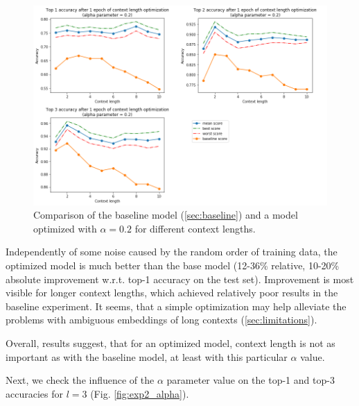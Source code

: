\documentclass{llncs}
\begin{document}
\begin{figure}
    \centering
    \caption{Comparison of the baseline model (\ref{sec:baseline}) and a model optimized with \(\alpha=0.2\) for different context lengths.}
    \label{fig:exp1_optimization}
    \includegraphics[scale=0.7]{res/exp1_context_top_acc.png}
\end{figure}

Independently of some noise caused by the random order of training data, the optimized model is much better than the base model (12-36\% relative, 10-20\% absolute improvement w.r.t. top-1 accuracy on the test set).
Improvement is most visible for longer context lengths, which achieved relatively poor results in the baseline experiment.
It seems, that a simple optimization may help alleviate the problems with ambiguous embeddings of long contexts (\ref{sec:limitations}).

Overall, results suggest, that for an optimized model, context length is not as important as with the baseline model, at least with this particular \(\alpha\) value.

\bigskip
Next, we check the influence of the \(\alpha\) parameter value on the top-1 and top-3 accuracies for \(l=3\) (Fig. \ref{fig:exp2_alpha}).
\end{document}
